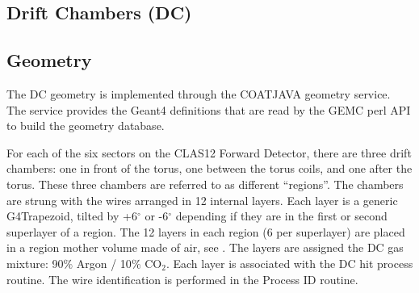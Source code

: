 \subsection{Drift Chambers (DC)}

\subsection{Geometry}

The DC geometry is implemented through the COATJAVA geometry service.
The service provides the Geant4 definitions that are read by the GEMC perl API to build the geometry database.

For each of the six sectors on the CLAS12 Forward Detector, there are three drift chambers: one in front of the torus,
one between the torus coils, and one after the torus.  These three chambers are referred to as different ``regions''.
The chambers are strung with the wires arranged in 12 internal layers.
Each layer is a generic G4Trapezoid, tilted by +6$^{\circ}$ or -6$^{\circ}$ depending if they are in the first or second
superlayer of a region.
The 12 layers in each region (6 per superlayer) are placed in a region mother volume made of air, see .
The layers are assigned the DC gas mixture: 90$\%$ Argon / 10$\%$ CO$_2$. Each layer is associated with the DC hit process routine.
The wire identification is performed in the Process ID routine.

